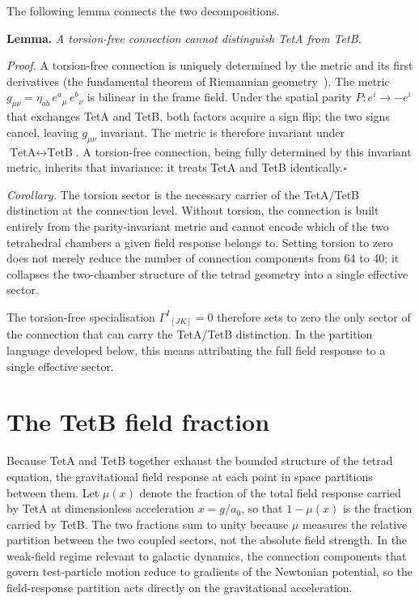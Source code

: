 \documentclass[twocolumn]{iopjournal}
\begin{document}
The following lemma connects the two decompositions.

\medskip
\noindent\textbf{Lemma.} \textit{A torsion-free connection
cannot distinguish TetA from TetB.}

\medskip\noindent\textit{Proof.}
A torsion-free connection is uniquely determined by the metric
and its first derivatives (the fundamental theorem of Riemannian
geometry~\cite{MTW}). The metric
$g_{\mu\nu} = \eta_{ab}\,e^a{}_\mu\,e^b{}_\nu$ is bilinear in
the frame field. Under the spatial parity
$P: e^i \to -e^i$ that exchanges TetA and TetB, both factors
acquire a sign flip; the two signs cancel, leaving $g_{\mu\nu}$
invariant. The metric is therefore invariant under
$\text{TetA} \leftrightarrow \text{TetB}$. A torsion-free
connection, being fully determined by this invariant metric,
inherits that invariance: it treats TetA and TetB
identically.\hfill$\square$

\medskip
\noindent\textit{Corollary.} The torsion sector is the
necessary carrier of the TetA/TetB distinction at the
connection level. Without torsion, the connection is built
entirely from the parity-invariant metric and cannot encode
which of the two tetrahedral chambers a given field response
belongs to. Setting torsion to zero does not merely reduce the
number of connection components from 64 to 40; it collapses the
two-chamber structure of the tetrad geometry into a single
effective sector.

The torsion-free specialisation
$\Gamma^I{}_{[JK]} = 0$ therefore sets to zero the only sector
of the connection that can carry the TetA/TetB distinction. In
the partition language developed below, this means attributing
the full field response to a single effective sector.


\section{The TetB field fraction}

Because TetA and TetB together exhaust the bounded structure of
the tetrad equation, the gravitational field response at each
point in space partitions between them. Let $\mu(x)$ denote the
fraction of the total field response carried by TetA at
dimensionless acceleration $x = g/a_0$, so that $1 - \mu(x)$ is
the fraction carried by TetB. The two fractions sum to unity
because $\mu$ measures the relative partition between the two
coupled sectors, not the absolute field strength. In the
weak-field regime relevant to galactic dynamics, the connection
components that govern test-particle motion reduce to gradients
of the Newtonian potential, so the field-response partition acts
directly on the gravitational acceleration.
\end{document}

